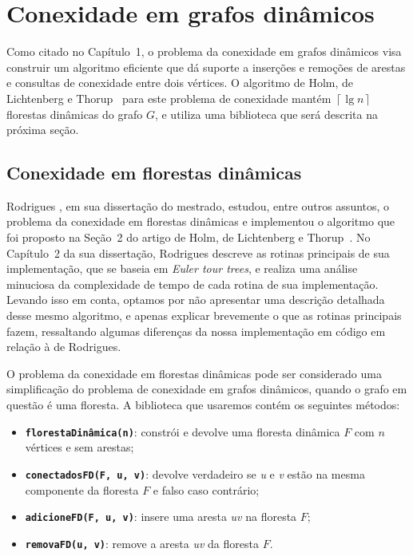 

\chapter{Conexidade em grafos dinâmicos}

\enlargethispage{.8\baselineskip}

Como citado no Capítulo~1, o problema da conexidade em grafos dinâmicos visa construir um algoritmo eficiente que dá suporte a inserções e remoções de arestas e consultas de conexidade entre dois vértices. O algoritmo de Holm, de Lichtenberg e Thorup~\cite{jacob_holm} para este problema de conexidade mantém $\left\lceil \lg n \right\rceil$ florestas dinâmicas do grafo $G$, e utiliza uma biblioteca que será descrita na próxima seção. 

\section{Conexidade em florestas dinâmicas}
\label{sec:dynamic-forest-connectivity}

Rodrigues \cite{arthur}, em sua dissertação do mestrado, estudou, entre outros assuntos, o problema da conexidade em florestas dinâmicas e implementou o algoritmo que foi proposto na Seção~2 do artigo de Holm, de Lichtenberg e Thorup~\cite{jacob_holm}. No Capítulo~2 da sua dissertação, Rodrigues descreve as rotinas principais de sua implementação, que se baseia em \textit{Euler tour trees}, e realiza uma análise minuciosa da complexidade de tempo de cada rotina de sua implementação. Levando isso em conta, optamos por não apresentar uma descrição detalhada desse mesmo algoritmo, e apenas explicar brevemente o que as rotinas principais fazem, ressaltando algumas diferenças da nossa implementação em código em relação à de Rodrigues.  

O problema da conexidade em florestas dinâmicas pode ser considerado uma simplificação do problema de conexidade em grafos dinâmicos, quando o grafo em questão é uma floresta. A biblioteca que usaremos contém os seguintes métodos:

\begin{itemize}
    \item \texttt{\textbf{florestaDinâmica(n)}}: constrói e devolve uma floresta dinâmica $F$ com $n$ vértices e sem arestas;
    \item \texttt{\textbf{conectadosFD(F, u, v)}}: devolve verdadeiro se \textit{u} e \textit{v} estão na mesma componente da floresta $F$ e falso caso contrário;
    \item \texttt{\textbf{adicioneFD(F, u, v)}}: insere uma aresta \textit{uv} na floresta $F$;
    \item \texttt{\textbf{removaFD(u, v)}}: remove a aresta \textit{uv} da floresta $F$.
\end{itemize}


